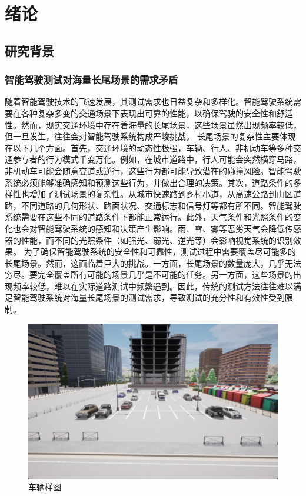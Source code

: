 \chapter{绪论}
\section{研究背景}
\subsection{智能驾驶测试对海量长尾场景的需求矛盾}
随着智能驾驶技术的飞速发展，其测试需求也日益复杂和多样化。智能驾驶系统需要在各种复杂多变的交通场景下表现出可靠的性能，以确保驾驶的安全性和舒适性。然而，现实交通环境中存在着海量的长尾场景，这些场景虽然出现频率较低，但一旦发生，往往会对智能驾驶系统构成严峻挑战。
长尾场景的复杂性主要体现在以下几个方面。首先，交通环境的动态性极强，车辆、行人、非机动车等多种交通参与者的行为模式千变万化。例如，在城市道路中，行人可能会突然横穿马路，非机动车可能会随意变道或逆行，这些行为都可能导致潜在的碰撞风险。智能驾驶系统必须能够准确感知和预测这些行为，并做出合理的决策。其次，道路条件的多样性也增加了测试场景的复杂性。从城市快速路到乡村小道，从高速公路到山区道路，不同道路的几何形状、路面状况、交通标志和信号灯等都有所不同。智能驾驶系统需要在这些不同的道路条件下都能正常运行。此外，天气条件和光照条件的变化也会对智能驾驶系统的感知和决策产生影响。雨、雪、雾等恶劣天气会降低传感器的性能，而不同的光照条件（如强光、弱光、逆光等）会影响视觉系统的识别效果。
为了确保智能驾驶系统的安全性和可靠性，测试过程中需要覆盖尽可能多的长尾场景。然而，这面临着巨大的挑战。一方面，长尾场景的数量庞大，几乎无法穷尽。要完全覆盖所有可能的场景几乎是不可能的任务。另一方面，这些场景的出现频率较低，难以在实际道路测试中频繁遇到。因此，传统的测试方法往往难以满足智能驾驶系统对海量长尾场景的测试需求，导致测试的充分性和有效性受到限制。
\begin{figure}[h]
	\centering
	\includegraphics[width=1.0\textwidth]{"images/车辆样式图.pdf"}
	\caption{车辆样图}
	\label{fig:vehicle_sample}
\end{figure}
